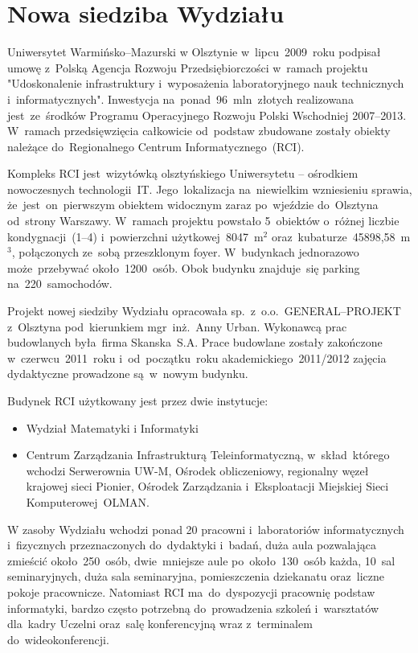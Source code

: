 ﻿\documentclass[a4paper,12pt]{article}
\begin{document}
\section{Nowa siedziba Wydziału}
Uniwersytet Warmińsko--Mazurski w Olsztynie w~lipcu~2009~roku podpisał umowę z~Polską Agencja Rozwoju Przedsiębiorczości w~ramach projektu "Udoskonalenie infrastruktury i~wyposażenia laboratoryjnego nauk technicznych i~informatycznych". Inwestycja na~ponad~96~mln~złotych realizowana jest~ze~środków Programu Operacyjnego Rozwoju Polski Wschodniej 2007--2013. W~ramach przedsięwzięcia całkowicie od~podstaw zbudowane zostały obiekty należące do~Regionalnego Centrum Informatycznego~(RCI).

Kompleks RCI jest~wizytówką olsztyńskiego Uniwersytetu -- ośrodkiem nowoczesnych technologii~IT. Jego~lokalizacja na~niewielkim wzniesieniu sprawia, że~jest~on~pierwszym obiektem widocznym zaraz po~wjeździe do~Olsztyna od~strony Warszawy. 
W~ramach projektu powstało 5~obiektów o~różnej liczbie kondygnacji~(1--4) 
i~powierzchni użytkowej~8047~m$^2$ oraz~kubaturze~45898,58~m$^3$, połączonych 
ze~sobą przeszklonym foyer. W~budynkach jednorazowo może~przebywać około~1200~osób. Obok budynku znajduje~się parking na~220~samochodów.

Projekt nowej siedziby Wydziału opracowała sp.~z~o.o.~GENERAL--{\linebreak}PROJEKT z~Olsztyna 
pod~kierunkiem mgr~inż.~Anny Urban. Wykonawcą prac budowlanych była~firma 
Skanska~S.A. Prace budowlane zostały zakończone w~czerwcu~2011~roku 
i~od~początku~roku akademickiego~2011/2012 zajęcia dydaktyczne prowadzone
są~w~nowym budynku.

Budynek RCI użytkowany jest przez dwie instytucje:
\begin{itemize}
	\item Wydział Matematyki i Informatyki
	\item Centrum Zarządzania Infrastrukturą Teleinformatyczną, w~skład~którego wchodzi Serwerownia UW-M, Ośrodek obliczeniowy, regionalny węzeł krajowej sieci Pionier, Ośrodek Zarządzania i~Eksploatacji Miejskiej Sieci Komputerowej~OLMAN.
\end{itemize}

W zasoby Wydziału wchodzi ponad 20 pracowni i~laboratoriów informatycznych 
i~fizycznych przeznaczonych do~dydaktyki i~badań, duża aula pozwalająca zmieścić około~250~osób, dwie~mniejsze aule po~około~130~osób każda, 10~sal seminaryjnych, duża sala seminaryjna, pomieszczenia dziekanatu oraz~liczne pokoje pracownicze.
Natomiast RCI ma~do~dyspozycji pracownię podstaw informatyki, bardzo często potrzebną do~prowadzenia szkoleń i~warsztatów dla~kadry Uczelni oraz~salę konferencyjną wraz z~terminalem do~wideokonferencji.
\end{document}
